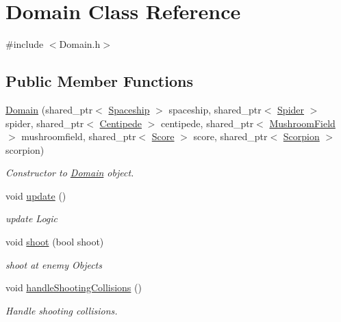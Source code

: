 \hypertarget{class_domain}{}\section{Domain Class Reference}
\label{class_domain}


{\ttfamily \#include $<$Domain.\+h$>$}

\subsection*{Public Member Functions}
\begin{DoxyCompactItemize}
\item 
\mbox{\hyperlink{class_domain_ad8bf2e62e2425901b6b1cfb3c46a5545}{Domain}} (shared\+\_\+ptr$<$ \mbox{\hyperlink{class_spaceship}{Spaceship}} $>$ spaceship, shared\+\_\+ptr$<$ \mbox{\hyperlink{class_spider}{Spider}} $>$ spider, shared\+\_\+ptr$<$ \mbox{\hyperlink{class_centipede}{Centipede}} $>$ centipede, shared\+\_\+ptr$<$ \mbox{\hyperlink{class_mushroom_field}{Mushroom\+Field}} $>$ mushroomfield, shared\+\_\+ptr$<$ \mbox{\hyperlink{class_score}{Score}} $>$ score, shared\+\_\+ptr$<$ \mbox{\hyperlink{class_scorpion}{Scorpion}} $>$ scorpion)
\begin{DoxyCompactList}\small\item\em Constructor to \mbox{\hyperlink{class_domain}{Domain}} object. \end{DoxyCompactList}\item 
\mbox{\label{class_domain_a9cb54e1d6a48ac2f18644e3c81b1d615}} 
void \mbox{\hyperlink{class_domain_a9cb54e1d6a48ac2f18644e3c81b1d615}{update}} ()
\begin{DoxyCompactList}\small\item\em update Logic \end{DoxyCompactList}\item 
void \mbox{\hyperlink{class_domain_abac8643664087595ce3f46eb038e973f}{shoot}} (bool shoot)
\begin{DoxyCompactList}\small\item\em shoot at enemy Objects \end{DoxyCompactList}\item 
\mbox{\label{class_domain_aaa64201c4c2e32c031125599b3cab606}} 
void \mbox{\hyperlink{class_domain_aaa64201c4c2e32c031125599b3cab606}{handle\+Shooting\+Collisions}} ()
\begin{DoxyCompactList}\small\item\em Handle shooting collisions. \end{DoxyCompactList}\item 

\end{DoxyCompactItemize}
